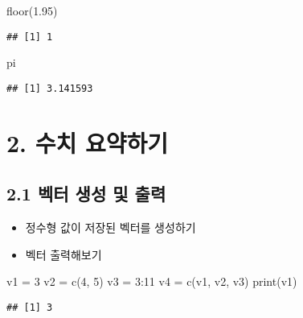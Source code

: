 \documentclass[
]{article}
\newenvironment{Shaded}{\begin{snugshade}}{\end{snugshade}}
\newcommand{\DecValTok}[1]{\textcolor[rgb]{0.00,0.00,0.81}{#1}}
\newcommand{\FloatTok}[1]{\textcolor[rgb]{0.00,0.00,0.81}{#1}}
\newcommand{\FunctionTok}[1]{\textcolor[rgb]{0.00,0.00,0.00}{#1}}
\newcommand{\NormalTok}[1]{#1}
\newcommand{\OtherTok}[1]{\textcolor[rgb]{0.56,0.35,0.01}{#1}}
\newcommand{\SpecialCharTok}[1]{\textcolor[rgb]{0.00,0.00,0.00}{#1}}
\providecommand{\tightlist}{%
  \setlength{\itemsep}{0pt}\setlength{\parskip}{0pt}}
\begin{document}
\begin{Shaded}
\begin{Highlighting}[]
\FunctionTok{floor}\NormalTok{(}\FloatTok{1.95}\NormalTok{)}
\end{Highlighting}
\end{Shaded}

\begin{verbatim}
## [1] 1
\end{verbatim}

\begin{Shaded}
\begin{Highlighting}[]
\NormalTok{pi}
\end{Highlighting}
\end{Shaded}

\begin{verbatim}
## [1] 3.141593
\end{verbatim}

\hypertarget{uxc218uxce58-uxc694uxc57duxd558uxae30}{%
\section{2. 수치 요약하기}\label{uxc218uxce58-uxc694uxc57duxd558uxae30}}

\hypertarget{uxbca1uxd130-uxc0dduxc131-uxbc0f-uxcd9cuxb825}{%
\subsection{2.1 벡터 생성 및
출력}\label{uxbca1uxd130-uxc0dduxc131-uxbc0f-uxcd9cuxb825}}

\begin{itemize}
\tightlist
\item
  정수형 값이 저장된 벡터를 생성하기
\item
  벡터 출력해보기
\end{itemize}

\begin{Shaded}
\begin{Highlighting}[]
\NormalTok{v1 }\OtherTok{=} \DecValTok{3}
\NormalTok{v2 }\OtherTok{=} \FunctionTok{c}\NormalTok{(}\DecValTok{4}\NormalTok{, }\DecValTok{5}\NormalTok{)}
\NormalTok{v3 }\OtherTok{=} \DecValTok{3}\SpecialCharTok{:}\DecValTok{11}
\NormalTok{v4 }\OtherTok{=} \FunctionTok{c}\NormalTok{(v1, v2, v3)}
\FunctionTok{print}\NormalTok{(v1)}
\end{Highlighting}
\end{Shaded}

\begin{verbatim}
## [1] 3
\end{verbatim}
\end{document}

